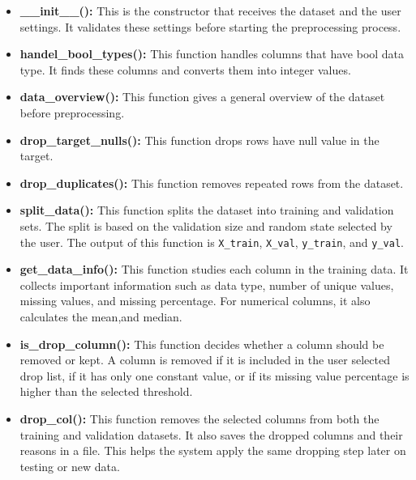 \documentclass[12pt,a4paper]{report}
\begin{document}
\begin{itemize}
    \item \textbf{\_\_init\_\_():}
    This is the constructor that receives the dataset and the user settings. 
    It validates these settings before starting the preprocessing process. 
    \item \textbf{handel\_bool\_types():}
    This function handles columns that have bool data type. It finds these columns and converts them into integer values.

    \item \textbf{data\_overview():}
    This function gives a general overview of the dataset before preprocessing.
    \item \textbf{drop\_target\_nulls():}
    This function drops rows have null value in the target.

    \item \textbf{drop\_duplicates():}
    This function removes repeated rows from the dataset.

    \item \textbf{split\_data():}
    This function splits the dataset into training and validation sets. The split is
    based on the validation size and random state selected by the user. The output of
    this function is \texttt{X\_train}, \texttt{X\_val}, \texttt{y\_train}, and
    \texttt{y\_val}.

    \item \textbf{get\_data\_info():}
    This function studies each column in the training data. It collects important
    information such as data type, number of unique values,
    missing values, and missing percentage. For numerical columns, it also calculates the mean,and median.

    \item \textbf{is\_drop\_column():}
    This function decides whether a column should be removed or kept. A column is
    removed if it is included in the user selected drop list, if it has only one constant
    value, or if its missing value percentage is higher than the selected threshold. 
    \item \textbf{drop\_col():}
    This function removes the selected columns from both the training and validation
    datasets. It also saves the dropped columns and their reasons in a file. This helps
    the system apply the same dropping step later on testing or new data.


\end{itemize}
\end{document}
